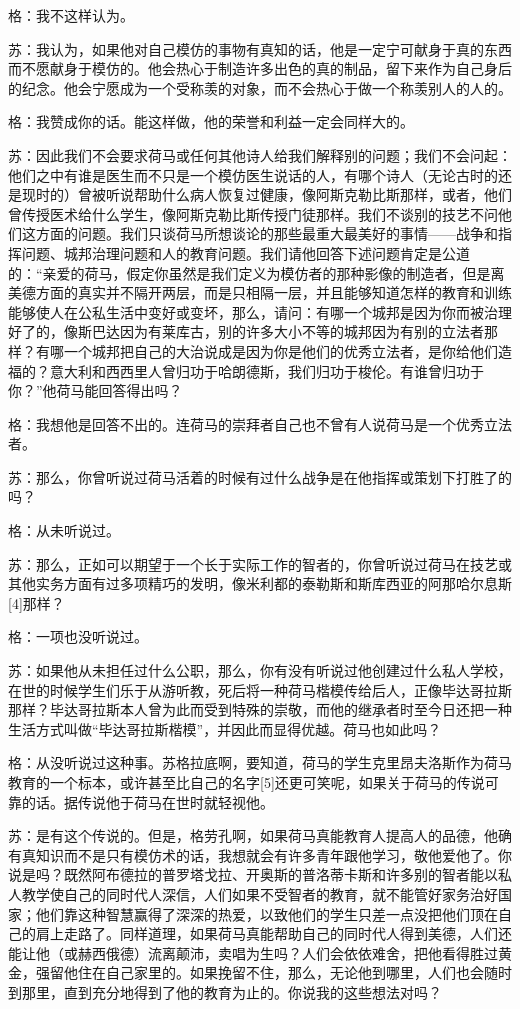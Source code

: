 \documentclass[12pt,oneside]{book}
\begin{document}
格：我不这样认为。

苏：我认为，如果他对自己模仿的事物有真知的话，他是一定宁可献身于真的东西而不愿献身于模仿的。他会热心于制造许多出色的真的制品，留下来作为自己身后的纪念。他会宁愿成为一个受称羡的对象，而不会热心于做一个称羡别人的人的。

格：我赞成你的话。能这样做，他的荣誉和利益一定会同样大的。

苏：因此我们不会要求荷马或任何其他诗人给我们解释别的问题；我们不会问起：他们之中有谁是医生而不只是一个模仿医生说话的人，有哪个诗人（无论古时的还是现时的）曾被听说帮助什么病人恢复过健康，像阿斯克勒比斯那样，或者，他们曾传授医术给什么学生，像阿斯克勒比斯传授门徒那样。我们不谈别的技艺不问他们这方面的问题。我们只谈荷马所想谈论的那些最重大最美好的事情——战争和指挥问题、城邦治理问题和人的教育问题。我们请他回答下述问题肯定是公道的：“亲爱的荷马，假定你虽然是我们定义为模仿者的那种影像的制造者，但是离美德方面的真实并不隔开两层，而是只相隔一层，并且能够知道怎样的教育和训练能够使人在公私生活中变好或变坏，那么，请问：有哪一个城邦是因为你而被治理好了的，像斯巴达因为有莱库古，别的许多大小不等的城邦因为有别的立法者那样？有哪一个城邦把自己的大治说成是因为你是他们的优秀立法者，是你给他们造福的？意大利和西西里人曾归功于哈朗德斯，我们归功于梭伦。有谁曾归功于你？”他荷马能回答得出吗？

格：我想他是回答不出的。连荷马的崇拜者自己也不曾有人说荷马是一个优秀立法者。

苏：那么，你曾听说过荷马活着的时候有过什么战争是在他指挥或策划下打胜了的吗？

格：从未听说过。

苏：那么，正如可以期望于一个长于实际工作的智者的，你曾听说过荷马在技艺或其他实务方面有过多项精巧的发明，像米利都的泰勒斯和斯库西亚的阿那哈尔息斯[4]那样？

格：一项也没听说过。

苏：如果他从未担任过什么公职，那么，你有没有听说过他创建过什么私人学校，在世的时候学生们乐于从游听教，死后将一种荷马楷模传给后人，正像毕达哥拉斯那样？毕达哥拉斯本人曾为此而受到特殊的崇敬，而他的继承者时至今日还把一种生活方式叫做“毕达哥拉斯楷模”，并因此而显得优越。荷马也如此吗？

格：从没听说过这种事。苏格拉底啊，要知道，荷马的学生克里昂夫洛斯作为荷马教育的一个标本，或许甚至比自己的名字[5]还更可笑呢，如果关于荷马的传说可靠的话。据传说他于荷马在世时就轻视他。

苏：是有这个传说的。但是，格劳孔啊，如果荷马真能教育人提高人的品德，他确有真知识而不是只有模仿术的话，我想就会有许多青年跟他学习，敬他爱他了。你说是吗？既然阿布德拉的普罗塔戈拉、开奥斯的普洛蒂卡斯和许多别的智者能以私人教学使自己的同时代人深信，人们如果不受智者的教育，就不能管好家务治好国家；他们靠这种智慧赢得了深深的热爱，以致他们的学生只差一点没把他们顶在自己的肩上走路了。同样道理，如果荷马真能帮助自己的同时代人得到美德，人们还能让他（或赫西俄德）流离颠沛，卖唱为生吗？人们会依依难舍，把他看得胜过黄金，强留他住在自己家里的。如果挽留不住，那么，无论他到哪里，人们也会随时到那里，直到充分地得到了他的教育为止的。你说我的这些想法对吗？
\end{document}

